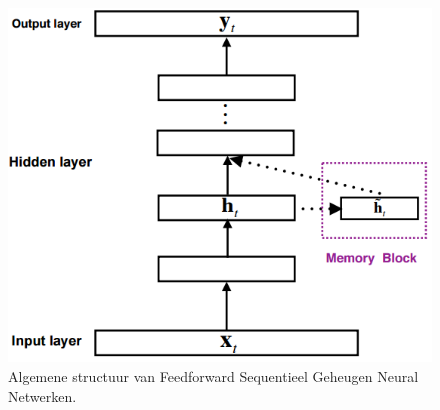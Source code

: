 \begin{figure}[tb]
	\centering
	\includegraphics[width=\linewidth]{Images/FSMN}
	\caption{Algemene structuur van Feedforward Sequentieel Geheugen Neural Netwerken.}
	\label{fig:glstm}
\end{figure}
